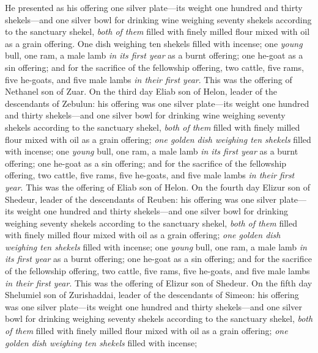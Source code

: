 \begin{biblechapter}
\verse He presented as his offering one silver plate—its weight one hundred and thirty shekels—and one silver bowl for drinking wine weighing seventy shekels according to the sanctuary shekel, \textit{both of them} filled with finely milled flour mixed with oil as a grain offering.
\verse One dish weighing ten shekels filled with incense;
\verse one \textit{young } bull, one ram, a male lamb \textit{in its first year} as a burnt offering;
\verse one he-goat as a sin offering;
\verse and for the sacrifice of the fellowship offering, two cattle, five rams, five he-goats, and five male lambs \textit{in their first year}. This was the offering of Nethanel son of Zuar.
\verse On the third day Eliab son of Helon, leader of the descendants of Zebulun:
\verse his offering was one silver plate—its weight one hundred and thirty shekels—and one silver bowl for drinking wine weighing seventy shekels according to the sanctuary shekel, \textit{both of them} filled with finely milled flour mixed with oil as a grain offering;
\verse \textit{one golden dish weighing ten shekels} filled with incense;
\verse one \textit{young} bull, one ram, a male lamb \textit{in its first year} as a burnt offering;
\verse one he-goat as a sin offering;
\verse and for the sacrifice of the fellowship offering, two cattle, five rams, five he-goats, and five male lambs \textit{in their first year}. This was the offering of Eliab son of Helon.
\verse On the fourth day Elizur son of Shedeur, leader of the descendants of Reuben:
\verse his offering was one silver plate—its weight one hundred and thirty shekels—and one silver bowl for drinking weighing seventy shekels according to the sanctuary shekel, \textit{both of them} filled with finely milled flour mixed with oil as a grain offering;
\verse \textit{one golden dish weighing ten shekels} filled with incense;
\verse one \textit{young} bull, one ram, a male lamb \textit{in its first year} as a burnt offering;
\verse one he-goat as a sin offering;
\verse and for the sacrifice of the fellowship offering, two cattle, five rams, five he-goats, and five male lambs \textit{in their first year}. This was the offering of Elizur son of Shedeur.
\verse On the fifth day Shelumiel son of Zurishaddai, leader of the descendants of Simeon:
\verse his offering was one silver plate—its weight one hundred and thirty shekels—and one silver bowl for drinking weighing seventy shekels according to the sanctuary shekel, \textit{both of them} filled with finely milled flour mixed with oil as a grain offering;
\verse \textit{one golden dish weighing ten shekels} filled with incense;

\end{biblechapter}
